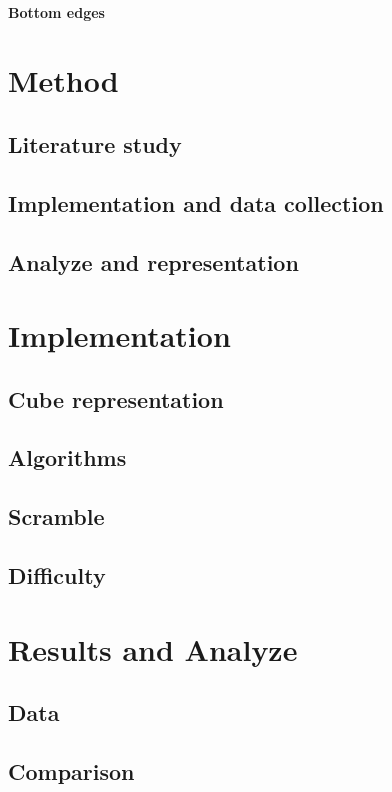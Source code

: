 \documentclass[a4paper,11pt]{kth-mag}
\begin{document}
\subsubsection{Bottom edges}

\chapter{Method}

\section{Literature study}
\section{Implementation and data collection}
\section{Analyze and representation}


\chapter{Implementation}
\section{Cube representation}
\section{Algorithms}
\section{Scramble}
\section{Difficulty}

\chapter{Results and Analyze}

\section{Data}
\section{Comparison}
\end{document}
